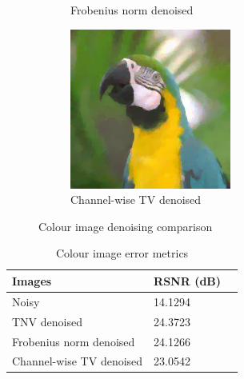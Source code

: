 \documentclass{article}
\begin{document}
\begin{figure}[ht]
\begin{subfigure}[b]{0.24\textwidth}
        \caption{Frobenius norm denoised}
        \label{fig:FrobeniusNormdenoised_colour}
    \end{subfigure}
    \begin{subfigure}[b]{0.24\textwidth}
        \centering
        \includegraphics[width=\textwidth]{images/ChannelwiseTVdenoised_colour.png}
        \caption{Channel-wise TV denoised}
        \label{fig:ChannelwiseTVdenoised_colour}
    \end{subfigure}
    \vspace{.3cm}

    \caption{Colour image denoising comparison}
    \label{fig:colour_comparison}
\end{figure}

\begin{table}[ht]
    \centering
    \begin{tabular}{| l | l | l |} 
        \hline
        \textbf{Images} & \textbf{RSNR (dB)} \\ [0.5ex] 
        \hline\hline
        Noisy & 14.1294 \\ 
        \hline
        TNV denoised & 24.3723 \\
        \hline
        Frobenius norm denoised & 24.1266 \\
        \hline
        Channel-wise TV denoised & 23.0542 \\
        \hline
    \end{tabular}
    \caption{Colour image error metrics}
    \label{tab:colour_metrics}
\end{table}
\end{document}
